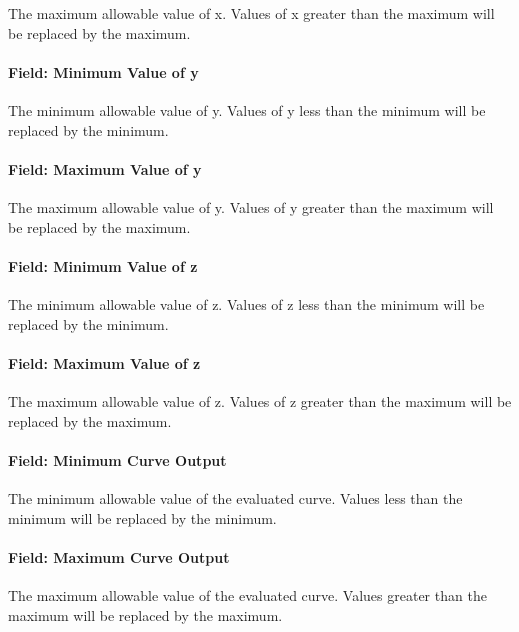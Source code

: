 The maximum allowable value of x. Values of x greater than the maximum will be replaced by the maximum.

\paragraph{Field: Minimum Value of y}\label{field-minimum-value-of-y}

The minimum allowable value of y. Values of y less than the minimum will be replaced by the minimum.

\paragraph{Field: Maximum Value of y}\label{field-maximum-value-of-y}

The maximum allowable value of y. Values of y greater than the maximum will be replaced by the maximum.

\paragraph{Field: Minimum Value of z}\label{field-minimum-value-of-z}

The minimum allowable value of z. Values of z less than the minimum will be replaced by the minimum.

\paragraph{Field: Maximum Value of z}\label{field-maximum-value-of-z}

The maximum allowable value of z. Values of z greater than the maximum will be replaced by the maximum.

\paragraph{Field: Minimum Curve Output}\label{field-minimum-curve-output-quadlinear}

The minimum allowable value of the evaluated curve. Values less than the minimum will be replaced by the minimum.

\paragraph{Field: Maximum Curve Output}\label{field-maximum-curve-output-quadlinear}

The maximum allowable value of the evaluated curve. Values greater than the maximum will be replaced by the maximum.

